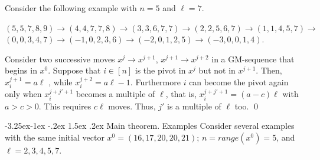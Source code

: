 \documentclass[10pt]{article}
\makeatletter
\renewcommand\subsection{\@startsection{subsection}{2}{\z@}
{-3.25ex\@plus -1ex \@minus -.2ex}
{1.5ex \@plus .2ex}
{\normalfont\normalsize\bfseries\boldmath}}
\theoremstyle{definition}
\makeatother
\begin{document}
Consider the following example with  $n=5$ and $\ell = 7$. 

\medskip 
\noindent
$(5,5,7,8,9) \to  (4,4,7,7,8)  \to  (3,3,6,7,7)  \to (2,2,5,6,7)  \to  (1,1,4,5,7) \to$ 
\newline
$(0,0,3,4,7) \to (-1,0,2,3,6) \to  (-2,0,1,2,5) \to (-3,0,0,1,4).$

\medskip 


\proof  
Consider two successive moves  
$x^j  \to x^{j+1}$, 
$x^{j+1} \to  x^{j+2}$ in a GM-sequence 
that begins in $x^0$.  
Suppose that  $i \in [n]$   is the pivot in $x^j$  
but not in $x^{j+1}$.
Then, $x^{j+1}_i = a \ell$ , while  $x^{j+2}_i = a \ell - 1$. 
Furthermore  $i$  can become the pivot again 
only when $x_i^{j+j'+1}$  becomes a multiple of  $\ell$, 
that is, $x_i^{j+j'+1} = (a - c) \ell$ with $a > c > 0$.
This requires $c \ell$  moves. 
Thus, $j'$  is a multiple of $\ell$ too. 
\qed 

\subsection{Main theorem. Examples} 
Consider several examples with the same initial vector 
$x^0 = (16,17,20,20,21)$;  $n =range(x^0) = 5$, 
and  $\ell = 2,3,4,5,7$. 
\end{document}
